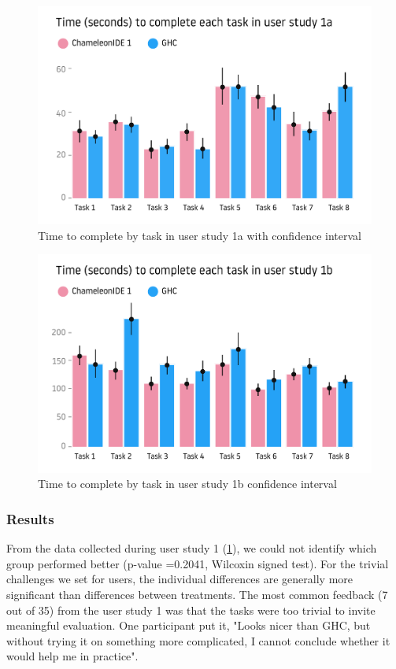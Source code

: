 \begin{figure}[h]
    \centering
    \includegraphics[width=\linewidth]{images/user-study-1a.pdf}
    \caption{Time to complete by task in user study 1a with confidence interval}
    \label{fig:r1-analysis}
\end{figure}


\begin{figure}[h]
    \centering
    \includegraphics[width=\linewidth]{images/user-study-1b.pdf}
    \caption{Time to complete by task in user study 1b confidence interval}
    \label{fig:r2-analysis}
\end{figure}

\subsubsection*{\textbf {Results}}

From the data collected during user study 1 (\ref{fig:r1-analysis}), we could not identify which group performed better (p-value =0.2041, Wilcoxin signed test). For the trivial challenges we set for users, the individual differences are generally more significant than differences between treatments. 
The most common feedback (7 out of 35) from the user study 1 was that the tasks were too trivial to invite meaningful evaluation. One participant put it, "Looks nicer than GHC, but without trying it on something more complicated, I cannot conclude whether it would help me in practice".

